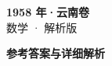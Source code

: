 \documentclass[zihao=-4, a4paper]{ctexart}
\begin{document}
\begin{center}
  {\Large\bfseries 1958 年·云南卷}\\[4pt]
  {\large 数学 · 解析版}
\end{center}
\medskip
{}

\clearpage
{}
\begin{center}{\Large\bfseries 参考答案与详细解析}\end{center}
\medskip

\end{document}
